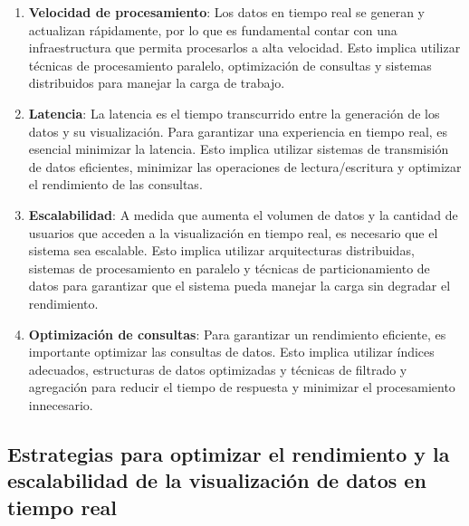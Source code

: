 \documentclass[
  a4paper,
]{article}
\begin{document}
\begin{enumerate}
\def\labelenumi{\arabic{enumi}.}
\item
  \textbf{Velocidad de procesamiento}: Los datos en tiempo real se
  generan y actualizan rápidamente, por lo que es fundamental contar con
  una infraestructura que permita procesarlos a alta velocidad. Esto
  implica utilizar técnicas de procesamiento paralelo, optimización de
  consultas y sistemas distribuidos para manejar la carga de trabajo.
\item
  \textbf{Latencia}: La latencia es el tiempo transcurrido entre la
  generación de los datos y su visualización. Para garantizar una
  experiencia en tiempo real, es esencial minimizar la latencia. Esto
  implica utilizar sistemas de transmisión de datos eficientes,
  minimizar las operaciones de lectura/escritura y optimizar el
  rendimiento de las consultas.
\item
  \textbf{Escalabilidad}: A medida que aumenta el volumen de datos y la
  cantidad de usuarios que acceden a la visualización en tiempo real, es
  necesario que el sistema sea escalable. Esto implica utilizar
  arquitecturas distribuidas, sistemas de procesamiento en paralelo y
  técnicas de particionamiento de datos para garantizar que el sistema
  pueda manejar la carga sin degradar el rendimiento.
\item
  \textbf{Optimización de consultas}: Para garantizar un rendimiento
  eficiente, es importante optimizar las consultas de datos. Esto
  implica utilizar índices adecuados, estructuras de datos optimizadas y
  técnicas de filtrado y agregación para reducir el tiempo de respuesta
  y minimizar el procesamiento innecesario.
\end{enumerate}

\hypertarget{estrategias-para-optimizar-el-rendimiento-y-la-escalabilidad-de-la-visualizaciuxf3n-de-datos-en-tiempo-real}{%
\subsection{Estrategias para optimizar el rendimiento y la escalabilidad
de la visualización de datos en tiempo
real}\label{estrategias-para-optimizar-el-rendimiento-y-la-escalabilidad-de-la-visualizaciuxf3n-de-datos-en-tiempo-real}}
\end{document}
